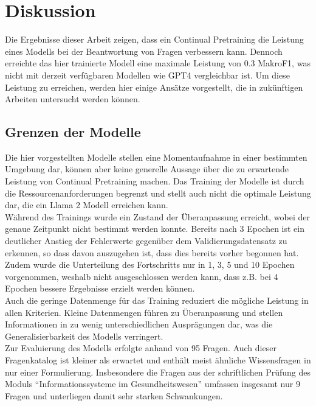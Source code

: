 \chapter{Diskussion}\label{ch:discussion}

Die Ergebnisse dieser Arbeit zeigen, dass ein Continual Pretraining die Leistung eines Modells bei der Beantwortung von Fragen verbessern kann.
Dennoch erreichte das hier trainierte Modell eine maximale Leistung von \num{0.3} MakroF1, was nicht mit derzeit verfügbaren Modellen wie GPT4 vergleichbar ist.
Um diese Leistung zu erreichen, werden hier einige Ansätze vorgestellt, die in zukünftigen Arbeiten untersucht werden können.

\section{Grenzen der Modelle}
Die hier vorgestellten Modelle stellen eine Momentaufnahme in einer bestimmten Umgebung dar, können aber keine generelle Aussage über die zu erwartende Leistung von Continual Pretraining machen.
Das Training der Modelle ist durch die Ressourcenanforderungen begrenzt und stellt auch nicht die optimale Leistung dar, die ein Llama 2 Modell erreichen kann.\\

Während des Trainings wurde ein Zustand der Überanpassung erreicht, wobei der genaue Zeitpunkt nicht bestimmt werden konnte.
Bereits nach 3 Epochen ist ein deutlicher Anstieg der Fehlerwerte gegenüber dem Validierungsdatensatz zu erkennen, so dass davon auszugehen ist, dass dies bereits vorher begonnen hat.
Zudem wurde die Unterteilung des Fortschritts nur in 1, 3, 5 und 10 Epochen vorgenommen, weshalb nicht ausgeschlossen werden kann, dass z.B. bei 4 Epochen bessere Ergebnisse erzielt werden können.\\

Auch die geringe Datenmenge für das Training reduziert die mögliche Leistung in allen Kriterien.
Kleine Datenmengen führen zu Überanpassung und stellen Informationen in zu wenig unterschiedlichen Ausprägungen dar, was die Generalisierbarkeit des Modells verringert.\\

Zur Evaluierung des Modells erfolgte anhand von \num{95} Fragen.
Auch dieser Fragenkatalog ist kleiner als erwartet und enthält meist ähnliche Wissensfragen in nur einer Formulierung.
Insbesondere die Fragen aus der schriftlichen Prüfung des Moduls \enquote{Informationssysteme im Gesundheitswesen} umfassen insgesamt nur 9 Fragen und unterliegen damit sehr starken Schwankungen.\\

